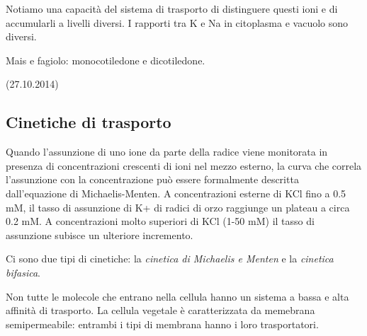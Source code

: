 \documentclass[a4paper,12pt]{book}
\begin{document}
Notiamo una capacità del sistema di trasporto di distinguere questi ioni e di accumularli a livelli diversi. I rapporti tra K e Na in citoplasma e vacuolo sono diversi.

Mais e fagiolo: monocotiledone e dicotiledone.

(27.10.2014)
\subsection{Cinetiche di trasporto}
Quando l’assunzione di uno ione da parte della radice viene monitorata in presenza di concentrazioni
crescenti di ioni nel mezzo esterno, la curva che correla l’assunzione con la concentrazione può essere
formalmente descritta dall’equazione di Michaelis-Menten. A concentrazioni esterne di KCl fino a 0.5
mM, il tasso di assunzione di K+ di radici di orzo raggiunge un plateau a circa 0.2 mM. A concentrazioni
molto superiori di KCl (1-50 mM) il tasso di assunzione subisce un ulteriore incremento.

Ci sono due tipi di cinetiche: la \emph{cinetica di Michaelis e Menten} e la \emph{cinetica bifasica}.

Non tutte le molecole che entrano nella cellula hanno un sistema a bassa e alta affinità di trasporto. La cellula vegetale è caratterizzata da memebrana semipermeabile: entrambi i tipi di membrana hanno i loro trasportatori.
\end{document}
